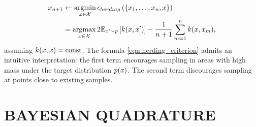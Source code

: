 \documentclass[]{article}
\begin{document}
%
%
\begin{align}
\vx_{n+1} &\leftarrow \argmin_{\vx \in \mathcal{X}} \label{eqn:herding_criterion} \epsilon_{herding}\left(\{\vx_1,\ldots,\vx_{n},\vx\}\right)\\
	&= \argmax_{\vx \in \mathcal{X}} 2 \expectargs{\vx' \sim p}{k(\vx, \vx')} - \frac{1}{n+1}\sum_{m=1}^{n} k(\vx,\vx_m)\mbox{,}\notag
\end{align}
%
assuming $k({x},{x}) = \mbox{const}$.
The formula \eqref{eqn:herding_criterion} admits an intuitive interpretation: the first term encourages sampling in areas with high mass under the target distribution $p({x})$.  The second term discourages sampling at points close to existing samples. 




\section{BAYESIAN QUADRATURE} 

\end{document}

